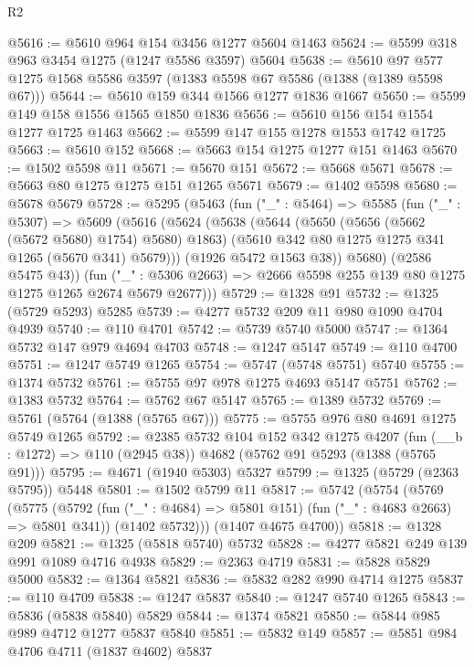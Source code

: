 \begin{lexlean}{R2}
\begin{coremodule}
@5616 := @5610 @964 @154 @3456 @1277 @5604 @1463
@5624 := @5599 @318 @963 @3454 @1275 (@1247 @5586 @3597) @5604
@5638 := @5610 @97 @577 @1275 @1568 @5586 @3597 (@1383 @5598 @67 @5586 (@1388 (@1389 @5598 @67)))
@5644 := @5610 @159 @344 @1566 @1277 @1836 @1667
@5650 := @5599 @149 @158 @1556 @1565 @1850 @1836
@5656 := @5610 @156 @154 @1554 @1277 @1725 @1463
@5662 := @5599 @147 @155 @1278 @1553 @1742 @1725
@5663 := @5610 @152
@5668 := @5663 @154 @1275 @1277 @151 @1463
@5670 := @1502 @5598 @11
@5671 := @5670 @151
@5672 := @5668 @5671
@5678 := @5663 @80 @1275 @1275 @151 @1265 @5671
@5679 := @1402 @5598
@5680 := @5678 @5679
@5728 := @5295
    (@5463
      (fun ("_" : @5464) =>
      @5585
        (fun ("_" : @5307) =>
        @5609
          (@5616
            (@5624
              (@5638
                (@5644
                  (@5650 (@5656 (@5662 (@5672 @5680) @1754) @5680) @1863)
                  (@5610 @342 @80 @1275 @1275 @341 @1265 (@5670 @341) @5679)))
              (@1926 @5472 @1563 @38))
            @5680)
          (@2586 @5475 @43))
        (fun ("_" : @5306 @2663) => @2666 @5598 @255 @139 @80 @1275 @1275 @1265 @2674 @5679 @2677)))
@5729 := @1328 @91
@5732 := @1325 (@5729 @5293) @5285
@5739 := @4277 @5732 @209 @11 @980 @1090 @4704 @4939
@5740 := @110 @4701
@5742 := @5739 @5740 @5000
@5747 := @1364 @5732 @147 @979 @4694 @4703
@5748 := @1247 @5147
@5749 := @110 @4700
@5751 := @1247 @5749 @1265
@5754 := @5747 (@5748 @5751) @5740
@5755 := @1374 @5732
@5761 := @5755 @97 @978 @1275 @4693 @5147 @5751
@5762 := @1383 @5732
@5764 := @5762 @67 @5147
@5765 := @1389 @5732
@5769 := @5761 (@5764 (@1388 (@5765 @67)))
@5775 := @5755 @976 @80 @4691 @1275 @5749 @1265
@5792 := @2385
    @5732
    @104
    @152
    @342
    @1275
    @4207
    (fun (__b : @1272) => @110 (@2945 @38))
    @4682
    (@5762 @91 @5293 (@1388 (@5765 @91)))
@5795 := @4671 (@1940 @5303) @5327
@5799 := @1325 (@5729 (@2363 @5795)) @5448
@5801 := @1502 @5799 @11
@5817 := @5742
    (@5754
      (@5769
        (@5775
          (@5792 (fun ("_" : @4684) => @5801 @151) (fun ("_" : @4683 @2663) => @5801 @341))
          (@1402 @5732)))
      (@1407 @4675 @4700))
@5818 := @1328 @209
@5821 := @1325 (@5818 @5740) @5732
@5828 := @4277 @5821 @249 @139 @991 @1089 @4716 @4938
@5829 := @2363 @4719
@5831 := @5828 @5829 @5000
@5832 := @1364 @5821
@5836 := @5832 @282 @990 @4714 @1275
@5837 := @110 @4709
@5838 := @1247 @5837
@5840 := @1247 @5740 @1265
@5843 := @5836 (@5838 @5840) @5829
@5844 := @1374 @5821
@5850 := @5844 @985 @989 @4712 @1277 @5837 @5840
@5851 := @5832 @149
@5857 := @5851 @984 @4706 @4711 (@1837 @4602) @5837

\end{coremodule}
\end{lexlean}
